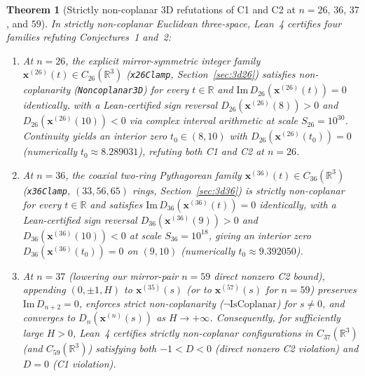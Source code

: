 \documentclass[11pt,reqno]{amsart}
\newtheorem{theorem}{Theorem}[section]
\theoremstyle{remark}
\newcommand{\R}{\mathbb{R}}
\begin{document}
\begin{theorem}[Strictly non-coplanar 3D refutations of C1 and C2 at $n = 26$, $36$, $37$, and $59$]\label{thm:main-3d}
In strictly non-coplanar Euclidean three-space, Lean~4 certifies four families refuting Conjectures~1 and~2:
\begin{enumerate}
  \item At $n = 26$, the explicit mirror-symmetric integer family $\mathbf{x}^{(26)}(t) \in C_{26}(\R^3)$ (\texttt{x26Clamp}, Section~\ref{sec:3d26}) satisfies non-coplanarity (\texttt{Non\allowbreak coplanar3D}) for every $t \in \R$ and $\mathrm{Im}\, D_{26}(\mathbf{x}^{(26)}(t)) = 0$ identically, with a Lean-certified sign reversal $D_{26}(\mathbf{x}^{(26)}(8)) > 0$ and $D_{26}(\mathbf{x}^{(26)}(10)) < 0$ via complex interval arithmetic at scale $S_{26} = 10^{30}$. Continuity yields an interior zero $t_0 \in (8, 10)$ with $D_{26}(\mathbf{x}^{(26)}(t_0)) = 0$ (numerically $t_0 \approx 8.289031$), refuting both C1 and C2 at $n = 26$.
  \item At $n = 36$, the coaxial two-ring Pythagorean family $\mathbf{x}^{(36)}(t) \in C_{36}(\R^3)$ (\texttt{x36Clamp}, $(33, 56, 65)$ rings, Section~\ref{sec:3d36}) is strictly non-coplanar for every $t \in \R$ and satisfies $\mathrm{Im}\, D_{36}(\mathbf{x}^{(36)}(t)) = 0$ identically, with a Lean-certified sign reversal $D_{36}(\mathbf{x}^{(36)}(9)) > 0$ and $D_{36}(\mathbf{x}^{(36)}(10)) < 0$ at scale $S_{36} = 10^{18}$, giving an interior zero $D_{36}(\mathbf{x}^{(36)}(t_0)) = 0$ on $(9, 10)$ (numerically $t_0 \approx 9.392050$).
  \item At $n = 37$ (lowering our mirror-pair $n = 59$ direct nonzero C2 bound), appending $(0, \pm 1, H)$ to $\mathbf{x}^{(35)}(s)$ (or to $\mathbf{x}^{(57)}(s)$ for $n = 59$) preserves $\mathrm{Im}\, D_{n+2} = 0$, enforces strict non-coplanarity ($\neg \mathrm{IsCoplanar}$) for $s \ne 0$, and converges to $D_n(\mathbf{x}^{(n)}(s))$ as $H \to +\infty$. Consequently, for sufficiently large $H > 0$, Lean~4 certifies strictly non-coplanar configurations in $C_{37}(\R^3)$ (and $C_{59}(\R^3)$) satisfying both $-1 < D < 0$ (direct nonzero C2 violation) and $D = 0$ (C1 violation).
\end{enumerate}
\end{theorem}
\end{document}
